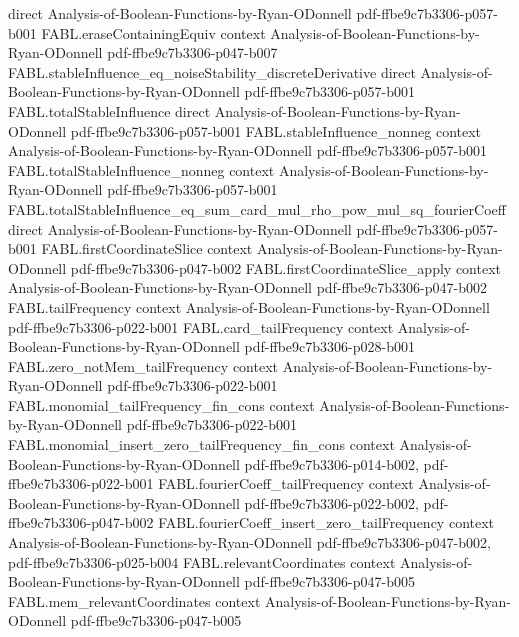 \begin{theorem}
  {direct}
  {Analysis-of-Boolean-Functions-by-Ryan-ODonnell}
  {pdf-ffbe9c7b3306-p057-b001}
\proofstep
  {FABL.eraseContainingEquiv}
  {context}
  {Analysis-of-Boolean-Functions-by-Ryan-ODonnell}
  {pdf-ffbe9c7b3306-p047-b007}
\proofstep
  {FABL.stableInfluence_eq_noiseStability_discreteDerivative}
  {direct}
  {Analysis-of-Boolean-Functions-by-Ryan-ODonnell}
  {pdf-ffbe9c7b3306-p057-b001}
\proofstep
  {FABL.totalStableInfluence}
  {direct}
  {Analysis-of-Boolean-Functions-by-Ryan-ODonnell}
  {pdf-ffbe9c7b3306-p057-b001}
\proofstep
  {FABL.stableInfluence_nonneg}
  {context}
  {Analysis-of-Boolean-Functions-by-Ryan-ODonnell}
  {pdf-ffbe9c7b3306-p057-b001}
\proofstep
  {FABL.totalStableInfluence_nonneg}
  {context}
  {Analysis-of-Boolean-Functions-by-Ryan-ODonnell}
  {pdf-ffbe9c7b3306-p057-b001}
\proofstep
  {FABL.totalStableInfluence_eq_sum_card_mul_rho_pow_mul_sq_fourierCoeff}
  {direct}
  {Analysis-of-Boolean-Functions-by-Ryan-ODonnell}
  {pdf-ffbe9c7b3306-p057-b001}
\proofstep
  {FABL.firstCoordinateSlice}
  {context}
  {Analysis-of-Boolean-Functions-by-Ryan-ODonnell}
  {pdf-ffbe9c7b3306-p047-b002}
\proofstep
  {FABL.firstCoordinateSlice_apply}
  {context}
  {Analysis-of-Boolean-Functions-by-Ryan-ODonnell}
  {pdf-ffbe9c7b3306-p047-b002}
\proofstep
  {FABL.tailFrequency}
  {context}
  {Analysis-of-Boolean-Functions-by-Ryan-ODonnell}
  {pdf-ffbe9c7b3306-p022-b001}
\proofstep
  {FABL.card_tailFrequency}
  {context}
  {Analysis-of-Boolean-Functions-by-Ryan-ODonnell}
  {pdf-ffbe9c7b3306-p028-b001}
\proofstep
  {FABL.zero_notMem_tailFrequency}
  {context}
  {Analysis-of-Boolean-Functions-by-Ryan-ODonnell}
  {pdf-ffbe9c7b3306-p022-b001}
\proofstep
  {FABL.monomial_tailFrequency_fin_cons}
  {context}
  {Analysis-of-Boolean-Functions-by-Ryan-ODonnell}
  {pdf-ffbe9c7b3306-p022-b001}
\proofstep
  {FABL.monomial_insert_zero_tailFrequency_fin_cons}
  {context}
  {Analysis-of-Boolean-Functions-by-Ryan-ODonnell}
  {pdf-ffbe9c7b3306-p014-b002,
    pdf-ffbe9c7b3306-p022-b001}
\proofstep
  {FABL.fourierCoeff_tailFrequency}
  {context}
  {Analysis-of-Boolean-Functions-by-Ryan-ODonnell}
  {pdf-ffbe9c7b3306-p022-b002,
    pdf-ffbe9c7b3306-p047-b002}
\proofstep
  {FABL.fourierCoeff_insert_zero_tailFrequency}
  {context}
  {Analysis-of-Boolean-Functions-by-Ryan-ODonnell}
  {pdf-ffbe9c7b3306-p047-b002,
    pdf-ffbe9c7b3306-p025-b004}
\proofstep
  {FABL.relevantCoordinates}
  {context}
  {Analysis-of-Boolean-Functions-by-Ryan-ODonnell}
  {pdf-ffbe9c7b3306-p047-b005}
\proofstep
  {FABL.mem_relevantCoordinates}
  {context}
  {Analysis-of-Boolean-Functions-by-Ryan-ODonnell}
  {pdf-ffbe9c7b3306-p047-b005}

\end{theorem}
